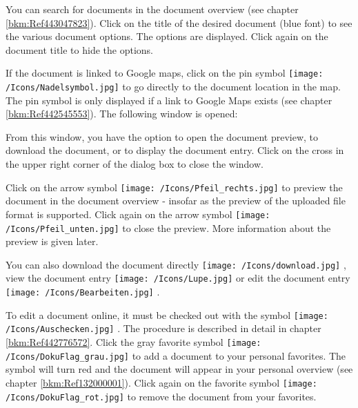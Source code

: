 You can search for documents in the document overview (see chapter \ref{bkm:Ref443047823}). Click on the title of the desired document (blue font)  to see the various document options. The options are displayed. Click again on the document title to hide the options. \newline

If the document is linked to Google maps, click on the pin symbol \texttt{[image: /Icons/Nadelsymbol.jpg]}  to go directly to the document location in the map. The pin symbol is only displayed if a link to Google Maps exists (see chapter \ref{bkm:Ref442545553}). The following window is opened:

\begin{figure}[H]
\end{figure}

From this window, you have the option to open the document preview, to download the document, or to display the document entry. Click on the cross in the upper right corner of the dialog box to close the window. \newline

Click on the arrow symbol \texttt{[image: /Icons/Pfeil\_rechts.jpg]}  to preview the document in the document overview - insofar as the preview of the uploaded file format is supported. Click again on the arrow symbol \texttt{[image: /Icons/Pfeil\_unten.jpg]} to close the preview. More information about the preview is given later. \newline

You can also download the document directly \texttt{[image: /Icons/download.jpg]} , view the document entry \texttt{[image: /Icons/Lupe.jpg]}  or edit the document entry \texttt{[image: /Icons/Bearbeiten.jpg]} . \newline

To edit a document online, it must be checked out with the symbol \texttt{[image: /Icons/Auschecken.jpg]} . The procedure is described in detail in chapter \ref{bkm:Ref442776572}. Click the gray favorite symbol \texttt{[image: /Icons/DokuFlag\_grau.jpg]}  to add a document to your personal favorites. The symbol will turn red and the document will appear in your personal overview (see chapter \ref{bkm:Ref132000001}). Click again on the favorite symbol \texttt{[image: /Icons/DokuFlag\_rot.jpg]} to remove the document from your favorites. \newline

